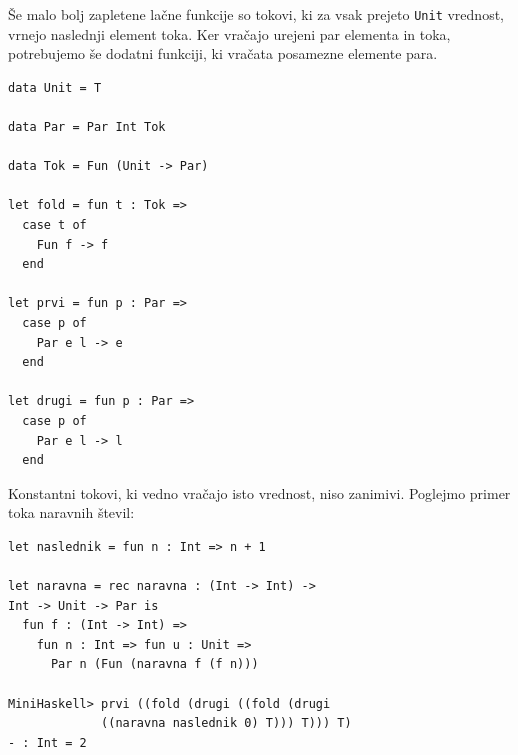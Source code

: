 \documentclass[a4paper,12pt,openright]{book}
\begin{document}
Še malo bolj zapletene lačne funkcije so tokovi, ki za vsak prejeto \lstinline{Unit} vrednost, vrnejo naslednji element toka. Ker vračajo urejeni 
par elementa in toka, potrebujemo še dodatni funkciji, ki vračata posamezne elemente para.
\begin{lstlisting}
data Unit = T

data Par = Par Int Tok

data Tok = Fun (Unit -> Par)

let fold = fun t : Tok =>
  case t of
    Fun f -> f
  end

let prvi = fun p : Par =>
  case p of
    Par e l -> e
  end

let drugi = fun p : Par =>
  case p of
    Par e l -> l
  end
\end{lstlisting}
Konstantni tokovi, ki vedno vračajo isto vrednost, niso zanimivi. Poglejmo 
primer toka naravnih števil:
\begin{lstlisting}
let naslednik = fun n : Int => n + 1

let naravna = rec naravna : (Int -> Int) -> 
Int -> Unit -> Par is
  fun f : (Int -> Int) =>
    fun n : Int => fun u : Unit =>
      Par n (Fun (naravna f (f n)))

MiniHaskell> prvi ((fold (drugi ((fold (drugi 
             ((naravna naslednik 0) T))) T))) T)
- : Int = 2
\end{lstlisting}
\end{document}
